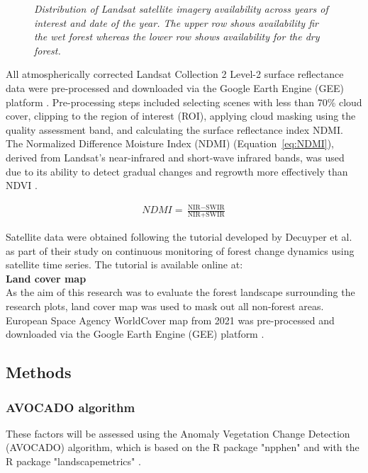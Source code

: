 \begin{figure}[h]
\caption{\textit{Distribution of Landsat satellite imagery availability across years of interest and date of the year. The upper row shows availability fir the wet forest whereas the lower row shows availability for the dry forest.}}
\label{fig:satellite}
\end{figure}


All atmospherically corrected Landsat Collection 2 Level-2 surface reflectance data were pre-processed and downloaded via the Google Earth Engine (GEE) platform \citep{gorelickGoogleEarthEngine2017}. Pre-processing steps included selecting scenes with less than 70\% cloud cover, clipping to the region of interest (ROI), applying cloud masking using the quality assessment band, and calculating the surface reflectance index NDMI. The Normalized Difference Moisture Index (NDMI) (Equation~\ref{eq:NDMI}), derived from Landsat's near-infrared and short-wave infrared bands, was used due to its ability to detect gradual changes and regrowth more effectively than NDVI \citep{vermotePreliminaryAnalysisPerformance2016}.

\begin{align}
\label{eq:NDMI}
NDMI = \frac{\text{NIR} - \text{SWIR}}{\text{NIR} + \text{SWIR}}
\end{align}

Satellite data were obtained following the tutorial developed by Decuyper et al. as part of their study on continuous monitoring of forest change dynamics using satellite time series. The tutorial is available online at:
\href{https://www.pucv.cl/uuaa/labgrs/proyectos/tutorial-to-the-anomaly-vegetation-change-detection-avocado}\\

\textbf{Land cover map}\\

As the aim of this research was to evaluate the forest landscape surrounding the research plots, land cover map was used to mask out all non-forest areas. European Space Agency WorldCover map from 2021 was pre-processed and downloaded via the Google Earth Engine (GEE) platform \citep{gorelickGoogleEarthEngine2017}.

\subsection{Methods}

\subsubsection{AVOCADO algorithm}
These factors will be assessed using the Anomaly Vegetation Change Detection (AVOCADO) algorithm, which is based on the R package "npphen" and with the R package "landscapemetrics" \citep{decuyperContinuousMonitoringForest2022, chavez2017npphen, hesselbarth2019landscapemetrics}. 


